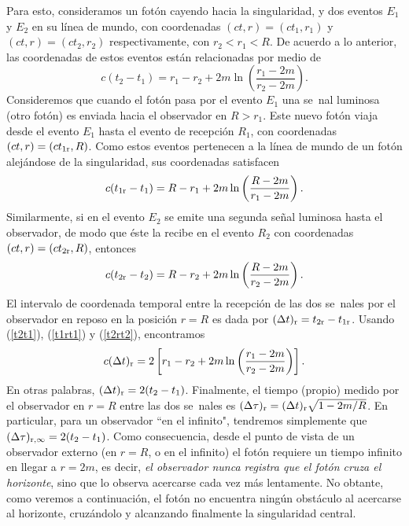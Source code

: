 Para esto, consideramos un fotón cayendo hacia la singularidad, y dos eventos $E_1$ y $E_2$ en su línea de mundo, con coordenadas $(ct,r)=(ct_1,r_1)$ y $(ct,r)=(ct_2,r_2)$ respectivamente, con $r_2<r_1<R$. De acuerdo a lo anterior, las coordenadas de estos eventos están relacionadas por medio de
\begin{equation}
c(t_2-t_1)=r_1-r_2+2m\ln\left(\frac{r_1-2m}{r_2-2m}\right). \label{t2t1}
\end{equation}
Consideremos que cuando el fotón pasa por el evento $E_1$ una se~nal luminosa (otro fotón) es enviada hacia el observador en $R>r_1$. Este nuevo fotón viaja desde el evento $E_1$ hasta el evento de recepción $R_1$, con coordenadas $(ct,r)=(ct_{1\rm r},R)$. Como estos eventos pertenecen a la línea de mundo de un fotón alejándose de la singularidad, sus coordenadas satisfacen
\begin{equation}
c(t_{1 \rm r}-t_1)=R-r_1+2m\ln\left(\frac{R-2m}{r_1-2m}\right).\label{t1rt1}
\end{equation}
Similarmente, si en el evento $E_2$ se emite una segunda señal luminosa hasta el observador, de modo que éste la recibe en el evento $R_2$ con coordenadas $(ct,r)=(ct_{2\rm r},R)$, entonces
\begin{equation}
c(t_{2 \rm r}-t_2)=R-r_2+2m\ln\left(\frac{R-2m}{r_2-2m}\right).\label{t2rt2}
\end{equation}
El intervalo de coordenada temporal entre la recepción de las dos se~nales por el observador en reposo en la posición $r=R$ es dada por $(\Delta t)_{\rm r}=t_{2 \rm r}-t_{1 \rm r}$. Usando (\ref{t2t1}), (\ref{t1rt1}) y (\ref{t2rt2}), encontramos
\begin{equation}
c(\Delta t)_{\rm r}=2\left[r_1-r_2+2m\ln\left(\frac{r_1-2m}{r_2-2m}\right)\right].
\end{equation}
En otras palabras, $(\Delta t)_{\rm r}=2(t_2-t_1)$. Finalmente, el tiempo (propio) medido por el observador en $r=R$ entre las dos se~nales es $(\Delta\tau)_{\rm r}=(\Delta t)_{\rm r}\sqrt{1-2m/R}$. En particular, para un observador ``en el infinito", tendremos simplemente que
$(\Delta\tau)_{{\rm r},\infty}=2(t_2-t_1)$. Como consecuencia, desde el punto de vista de un observador externo (en $r=R$, o en el infinito) el fotón requiere un tiempo infinito en llegar a $r=2m$, es decir, \textit{el observador nunca registra que el fotón cruza el horizonte}, sino que lo observa acercarse cada vez más lentamente. No obtante, como veremos a continuación, el fotón no encuentra ningún obstáculo al acercarse al horizonte, cruzándolo y alcanzando finalmente la singularidad central.

